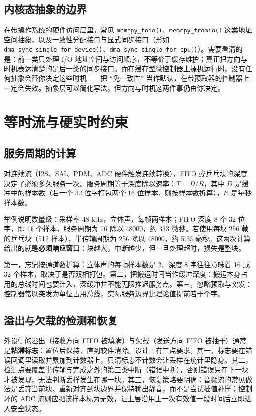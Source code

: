 \documentclass[12pt,a4paper,fontset=fandol]{ctexbook}
\newcommand{\Fn}[1]{\texttt{#1()}}
\begin{document}
\subsection{内核态抽象的边界}

在带操作系统的硬件访问层里，常见 \Fn{memcpy\_toio}、\Fn{memcpy\_fromio} 这类地址空间抽象，以及一致性分配接口与显式同步接口（形如 \Fn{dma\_sync\_single\_for\_device}、\Fn{dma\_sync\_single\_for\_cpu}）。需要看清的是：前一类只处理 I/O 地址空间与访问顺序，\textbf{不}等价于缓存维护；真正把方向与时机表达清楚的是后一类的同步接口。而在缓存型微控制器上裸机运行时，没有任何抽象会替你决定这些时机——把 ``免一致性'' 当作默认，在带预取器的控制器上一定会失效。抽象层可以简化写法，但方向与时机这两件事仍由你决定。

\section{等时流与硬实时约束}

\subsection{服务周期的计算}

对连续流（I2S、SAI、PDM、ADC 硬件触发连续转换），FIFO 或乒乓块的深度决定了必须多久服务一次。服务周期等于深度除以速率：$T = D / R$，其中 $D$ 是缓冲中的样本数（若一个 32 位字打包两个 16 位样本，则按样本数折算），$R$ 是每秒样本数。

举例说明数量级：采样率 48 kHz，立体声，每帧两样本；FIFO 深度 8 个 32 位字，即 16 个样本，服务周期为 16 除以 48000，约 333 微秒。若使用每块 256 帧的乒乓块（512 样本），半传输周期为 256 除以 48000，约 5.33 毫秒。这两次计算给出的就是\textbf{必须响应窗口}：块越大，中断越少，但一旦处理超时，损失是整块。

\begin{note}[title={服务周期计算里最容易错的三件事}]
第一，忘记按通道数折算：立体声的每帧样本数是 2，深度 8 字往往意味着 16 或 32 个样本，取决于是否双相打包。第二，把搬运时间当作缓冲深度：搬运本身占用的总线时间也要计入，深缓冲并不能无限推迟服务点。第三，忽略预取与突发：控制器常以突发为单位占用总线，实际服务边界比理论值提前若干个字。
\end{note}

\subsection{溢出与欠载的检测和恢复}

外设侧的溢出（接收方向 FIFO 被填满）与欠载（发送方向 FIFO 被抽干）通常是\textbf{粘滞标志}：置位后保持，直到软件清除。设计上有三点要求。其一，标志要在错误回调里读取并累加到计数器上，只清标志不计数会让丢样在统计里隐身。其二，检测点要覆盖半传输与完成之外的第三类中断（错误中断），否则错误只在下一块才被发现，无法判断丢样发生在哪一块。其三，恢复策略要明确：音频流的常见做法是丢弃当前块、重新对齐到块边界并保持输出静音，而不是尝试插值补样；控制环的 ADC 流则应把该样本标为无效，让上层沿用上一次有效值一段时间后立即进入安全状态。
\end{document}
